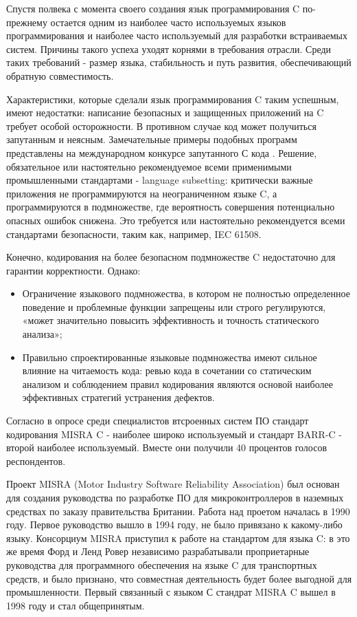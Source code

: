 Спустя полвека с момента своего создания язык программирования C по-прежнему остается одним из наиболее часто 
используемых языков программирования\autocite{TiobeIndex} и наиболее часто используемый для разработки 
встраиваемых систем. Причины такого успеха уходят корнями в требования отрасли. Среди таких требований - размер 
языка, стабильность и путь развития, обеспечивающий обратную совместимость.

Характеристики, которые сделали язык программирования C таким успешным, имеют недостатки: написание безопасных 
и защищенных приложений на C требует особой осторожности. В противном случае код может получиться 
запутанным и неясным. Замечательные примеры подобных программ представлены на международном конкурсе 
запутанного С кода \autocite{ioccc}. Решение, обязательное или настоятельно рекомендуемое 
всеми применимыми промышленными стандартами - language subsetting: критически важные приложения не 
программируются на неограниченном языке C, а программируются в подмножестве, где вероятность совершения 
потенциально опасных ошибок снижена. Это требуется или настоятельно рекомендуется всеми стандартами 
безопасности, таким как, например, IEC 61508\autocite{IEC}.

Конечно, кодирования на более безопасном подмножестве C недостаточно для гарантии корректности. Однако:

\begin{itemize}
    \item Ограничение языкового подмножества, в котором не полностью определенное поведение и 
    проблемные функции запрещены или строго регулируются, «может значительно повысить эффективность и  
    точность статического анализа»\autocite{astreeConf};
    \item Правильно спроектированные языковые подмножества имеют сильное влияние на читаемость кода:
    ревью кода в сочетании со статическим анализом и соблюдением правил кодирования являются основой 
    наиболее эффективных стратегий устранения дефектов.  
\end{itemize}

Согласно\autocite{bagnara2020barrc2018} в опросе среди специалистов втсроенных систем ПО  стандарт кодирования MISRA C\autocite{Misrac1998} - наиболее широко 
используемый и стандарт BARR-C\autocite{barrc} - второй наиболее используемый. Вместе они получили 40 процентов голосов респондентов.  

Проект MISRA (Motor Industry Software Reliability Association) был основан для создания руководства по разработке ПО для микроконтроллеров в 
наземных средствах по заказу правительства Британии. Работа над проетом началась в 1990 году.  Первое руководство вышло в 1994 году, не 
было привязано к какому-либо языку. Консорциум MISRA приступил к работе на стандартом для языка C: в это же время Форд и Ленд Ровер независимо разрабатывали проприетарные 
руководства для программного обеспечения на языке C для транспортных средств, и было признано, что совместная 
деятельность будет более выгодной для промышленности. Первый связанный с языком С стандрат MISRA C\autocite{Misrac1998} вышел в 1998 году и стал общепринятым. 

